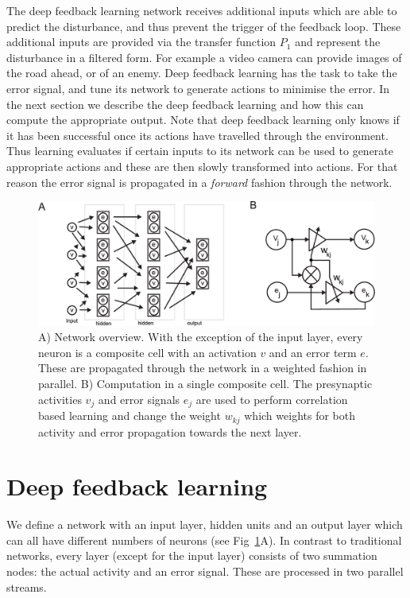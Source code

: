 \documentclass{aamas2018}
\begin{document}
The deep feedback learning network receives additional inputs which are able
to predict the disturbance, and thus prevent the trigger of the feedback
loop. These additional inputs are provided via the transfer function $P_1$
and represent the disturbance in a filtered form. For example a video camera
can provide images of the road ahead, or of an enemy. Deep feedback
learning has the task to take the error signal, and tune its network
to generate actions to minimise the error. In the next section
we describe the deep feedback learning and how this can
compute the appropriate output. Note that deep feedback learning only knows if it has been
successful once its actions have travelled through the environment. Thus learning
evaluates if certain inputs to its network can be used to generate
appropriate actions and these are then slowly transformed into actions.
For that reason the error signal is propagated in a \textsl{forward} fashion
through the network.

\begin{figure}[!ht]
  \centering
  \includegraphics[width=\columnwidth]{netw_together}
  \caption{A) Network overview. With the exception of the input layer, every
    neuron is a composite cell with an activation $v$ and an error
    term $e$. These are propagated through the network in a weighted
    fashion in parallel.  B) Computation in a single composite cell.
    The presynaptic activities $v_j$ and error signals $e_j$ are used
    to perform correlation based learning and change the weight
    $w_{kj}$ which weights for both activity and error propagation towards the next
    layer.\label{netw_together}}
\end{figure}


\section{Deep feedback learning}
We define a network with an input layer, hidden units and an output
layer which can all have different numbers of neurons (see
Fig~\ref{netw_together}A). In contrast to traditional
networks, every layer (except for the input layer) consists of two
summation nodes: the actual activity and an error signal. These
are processed in two parallel streams.
\end{document}
